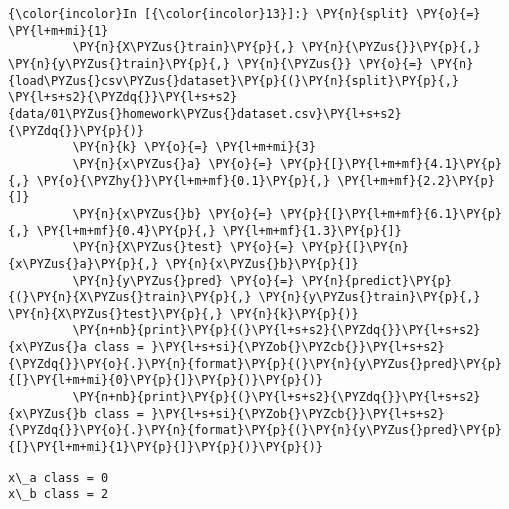     \begin{Verbatim}[commandchars=\\\{\}]
{\color{incolor}In [{\color{incolor}13}]:} \PY{n}{split} \PY{o}{=} \PY{l+m+mi}{1}
         \PY{n}{X\PYZus{}train}\PY{p}{,} \PY{n}{\PYZus{}}\PY{p}{,} \PY{n}{y\PYZus{}train}\PY{p}{,} \PY{n}{\PYZus{}} \PY{o}{=} \PY{n}{load\PYZus{}csv\PYZus{}dataset}\PY{p}{(}\PY{n}{split}\PY{p}{,} \PY{l+s+s2}{\PYZdq{}}\PY{l+s+s2}{data/01\PYZus{}homework\PYZus{}dataset.csv}\PY{l+s+s2}{\PYZdq{}}\PY{p}{)}
         \PY{n}{k} \PY{o}{=} \PY{l+m+mi}{3}
         \PY{n}{x\PYZus{}a} \PY{o}{=} \PY{p}{[}\PY{l+m+mf}{4.1}\PY{p}{,} \PY{o}{\PYZhy{}}\PY{l+m+mf}{0.1}\PY{p}{,} \PY{l+m+mf}{2.2}\PY{p}{]}
         \PY{n}{x\PYZus{}b} \PY{o}{=} \PY{p}{[}\PY{l+m+mf}{6.1}\PY{p}{,} \PY{l+m+mf}{0.4}\PY{p}{,} \PY{l+m+mf}{1.3}\PY{p}{]}
         \PY{n}{X\PYZus{}test} \PY{o}{=} \PY{p}{[}\PY{n}{x\PYZus{}a}\PY{p}{,} \PY{n}{x\PYZus{}b}\PY{p}{]}
         \PY{n}{y\PYZus{}pred} \PY{o}{=} \PY{n}{predict}\PY{p}{(}\PY{n}{X\PYZus{}train}\PY{p}{,} \PY{n}{y\PYZus{}train}\PY{p}{,} \PY{n}{X\PYZus{}test}\PY{p}{,} \PY{n}{k}\PY{p}{)}
         \PY{n+nb}{print}\PY{p}{(}\PY{l+s+s2}{\PYZdq{}}\PY{l+s+s2}{x\PYZus{}a class = }\PY{l+s+si}{\PYZob{}\PYZcb{}}\PY{l+s+s2}{\PYZdq{}}\PY{o}{.}\PY{n}{format}\PY{p}{(}\PY{n}{y\PYZus{}pred}\PY{p}{[}\PY{l+m+mi}{0}\PY{p}{]}\PY{p}{)}\PY{p}{)}
         \PY{n+nb}{print}\PY{p}{(}\PY{l+s+s2}{\PYZdq{}}\PY{l+s+s2}{x\PYZus{}b class = }\PY{l+s+si}{\PYZob{}\PYZcb{}}\PY{l+s+s2}{\PYZdq{}}\PY{o}{.}\PY{n}{format}\PY{p}{(}\PY{n}{y\PYZus{}pred}\PY{p}{[}\PY{l+m+mi}{1}\PY{p}{]}\PY{p}{)}\PY{p}{)}
\end{Verbatim}

    \begin{Verbatim}[commandchars=\\\{\}]
x\_a class = 0
x\_b class = 2

    \end{Verbatim}

